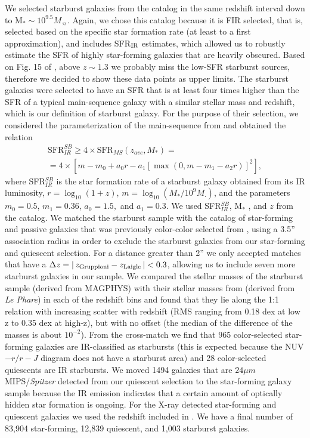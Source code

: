 We selected starburst galaxies from the \citet{2013MNRAS.432...23G} catalog in the same redshift interval down to M$_*\sim 10^{9.5} M_\sun$. Again, we chose this catalog because it is FIR selected, that is, selected based on the specific star formation rate (at least to a first approximation), and includes SFR$_{\rm IR}$ estimates, which allowed us to robustly estimate the SFR of highly star-forming galaxies that are heavily obscured. 
Based on Fig. 15 of \citet{2013MNRAS.432...23G}, above $z\sim1.3$ we probably miss the low-SFR starburst sources, therefore we decided to show these data points as upper limits.
 The starburst galaxies were selected to have an SFR that is at least four times higher than the SFR of a typical main-sequence galaxy with a similar stellar mass and redshift, which is our definition of starburst galaxy.
For the purpose of their selection, we considered the parameterization of the main-sequence from \citet{2015A&A...575A..74S} and obtained the relation
\begin{multline}  \label{eq:SFR_thresh}
\textrm{SFR}_{IR}^{SB} \geq 4 \times \textrm{SFR}_{MS}(z_{ave},M_*)=\\
=4 \times \left[m-m_0+a_0r-a_1[\max(0,m-m_1-a_2r)]^2 \right],
\end{multline}
where SFR$_{IR}^{SB}$ is the star formation rate of a starburst galaxy obtained from its IR luminosity, $r=\log_{10}(1+z)$, $m=\log_{10}(M_*/10^9M_\cdot)$, and the parameters $m_0=0.5$, $m_1=0.36$, $a_0=1.5,$ and $a_1=0.3$.
We used SFR$_{IR}^{SB}$, M$_*$ , and $z$ from the \citet{2013MNRAS.432...23G} catalog.
We matched the starburst sample with the catalog of star-forming and passive galaxies that was previously color-color selected from \citet{2016ApJS..224...24L}, using a 3.5'' association radius in order to exclude the starburst galaxies from our star-forming and quiescent selection. For a distance greater than 2'' we only accepted matches that have a $\Delta z = |\, z_{\rm Gruppioni} - z_{\rm Laigle} \,|<0.3$, allowing us to include seven more starburst galaxies in our sample.
We compared the stellar masses of the starburst sample (derived from MAGPHYS) with their stellar masses from \citet{2016ApJS..224...24L} (derived from \emph{Le Phare}) in each of the redshift bins and found that they lie along the 1:1 relation with increasing scatter with redshift (RMS ranging from 0.18 dex at low z to 0.35 dex at high-z), but with no offset (the median of the difference of the masses is about $10^{-2}$). From the cross-match we find that 965 color-selected star-forming galaxies are IR-classified as starbursts (this is expected because the NUV$ - r / r - J$ diagram does not have a starburst area) and 28 color-selected quiescents are IR starbursts. We moved 1494 galaxies that are $24\mu m$ MIPS/\textit{Spitzer} detected from our quiescent selection to the star-forming galaxy sample because the IR emission indicates that a certain amount of optically hidden star formation is ongoing. For the X-ray detected star-forming and quiescent galaxies we used the redshift included in \citet{2016ApJ...817...34M}. We have a final number of 83,904 star-forming, 12,839 quiescent, and 1,003 starburst galaxies.

